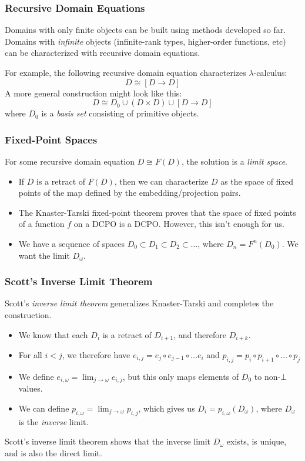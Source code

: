 \documentclass{beamer}
\begin{document}
\begin{frame}
  \frametitle{Recursive Domain Equations}
  Domains with only finite objects can be built using methods
  developed so far.  Domains with \emph{infinite} objects
  (infinite-rank types, higher-order functions, etc) can be
  characterized with recursive domain equations.

  For example, the following recursive domain equation characterizes
  $\lambda$-calculus:
  \[D \cong [D\rightarrow D]\]
  A more general construction might look like this:
  \[D \cong D_0 \cup (D \times D) \cup [D \rightarrow D]\]
  where $D_0$ is a \emph{basis set} consisting of primitive objects.
\end{frame}

\begin{frame}
  \frametitle{Fixed-Point Spaces}
  For some recursive domain equation $D \cong F(D)$, the solution is a
  \emph{limit space}.
  \begin{itemize}
    \item If $D$ is a retract of $F(D)$, then we can characterize
      $D$ as the space of fixed points of the map defined by the
      embedding/projection pairs.

    \item The Knaster-Tarski fixed-point theorem proves that the space of
      fixed points of a function $f$ on a DCPO is a DCPO.  However, this
      isn't enough for us.

    \item We have a sequence of spaces $D_0 \subset D_1 \subset D_2 \subset
      \ldots$, where $D_n = F^n(D_0)$.  We want the limit $D_{\omega}$.
  \end{itemize}
\end{frame}

\begin{frame}
  \frametitle{Scott's Inverse Limit Theorem}
  Scott's \emph{inverse limit theorem} generalizes Knaster-Tarski and
  completes the construction.
  \begin{itemize}
    \item We know that each $D_i$ is a retract of $D_{i+1}$, and
      therefore $D_{i+k}$.
    \item For all $i < j$, we therefore have $e_{i,j} = e_j\circ
      e_{j-1} \circ \ldots e_i$ and $p_{i,j} = p_i \circ p_{i+1} \circ
      \ldots \circ p_j$
    \item We define $e_{i,\omega} = \lim_{j\rightarrow\omega}e_{i,j}$,
      but this only maps elements of $D_0$ to non-$\bot$ values.
    \item We can define $p_{i,\omega} =
      \lim_{j\rightarrow\omega}p_{i,j}$, which gives us $D_i =
      p_{i,\omega}(D_{\omega})$, where $D_{\omega}$ is the
      \emph{inverse} limit.
  \end{itemize}
  Scott's inverse limit theorem shows that the inverse limit
  $D_{\omega}$ exists, is unique, and is also the direct limit.
\end{frame}
\end{document}
